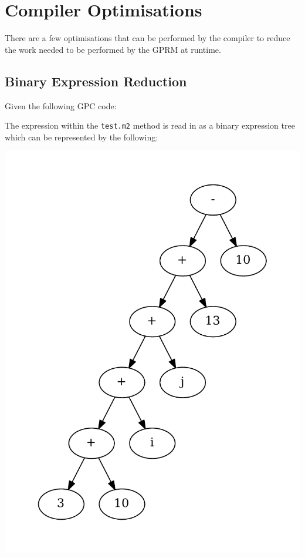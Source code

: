 \section{Compiler Optimisations}

    There are a few optimisations that can be performed by the compiler to reduce the work needed to be 
    performed by the GPRM at runtime.

\subsection{Binary Expression Reduction}
Given the following GPC code:    



The expression within the \texttt{test.m2} method is read in as a binary expression
tree which can be represented by the following:

\begin{center}
\includegraphics[scale=0.5]{graphs/evalTree.pdf}
\end{center}

